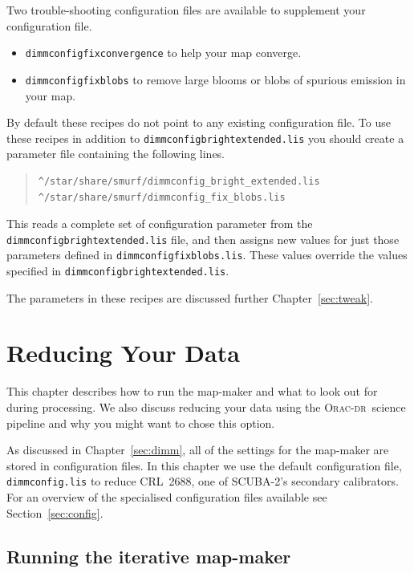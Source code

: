 \documentclass[twoside,11pt]{article}
\newcommand{\htmladdnormallink}[2]{#1}
\newcommand{\htmlref}[2]{#1}
\newcommand{\latexhtml}[2]{#1}
\newcommand{\xlabel}[1]{}
\renewcommand{\_}{\texttt{\symbol{95}}}
\newcommand{\oracdr}{\htmladdnormallink{\textsc{Orac-dr}}{http://www.oracdr.org/oracdr}}
\newcommand{\file}[1]{\texttt{#1}}
\newcommand{\cref}[3]{\latexhtml{#1~\ref{#2}}{\htmlref{#3}{#2}}}
\begin{document}
Two trouble-shooting configuration files are available to supplement your
configuration file.
\begin{itemize}[noitemsep]
\item \file{dimmconfig\_fix\_convergence} to help your map converge.
\item \file{dimmconfig\_fix\_blobs} to remove large blooms or blobs of spurious
emission in your map.
\end{itemize}
By default these recipes do not point to any existing configuration file. To use
these recipes in addition to  \file{dimmconfig\_bright\_extended.lis} you should
create a parameter file containing the following lines.
\begin{quote}
\begin{verbatim}
^/star/share/smurf/dimmconfig_bright_extended.lis
^/star/share/smurf/dimmconfig_fix_blobs.lis
\end{verbatim}
\end{quote}
This reads a complete set of configuration parameter from the
\file{dimmconfig\_bright\_extended.lis} file, and then assigns new values for just
those parameters defined in \file{dimmconfig\_fix\_blobs.lis}. These values override
the values specified in \file{dimmconfig\_bright\_extended.lis}.

The parameters in these recipes are discussed further
\cref{Chapter}{sec:tweak}{Tailoring Your Reduction}.

\clearpage

\section{\xlabel{maps}Reducing Your Data}
\label{sec:maps}

This chapter describes how to run the map-maker and what to look out
for during processing. We also discuss reducing your data using the
\oracdr\ science pipeline and why you might want to chose this option.

As discussed in \cref{Chapter}{sec:dimm}{The
Dynamic Iterative Map-Maker}, all of the settings for the map-maker
are stored in configuration files. In this chapter we use
the default configuration file, \file{dimmconfig.lis} to reduce CRL~2688,
one of SCUBA-2's secondary calibrators. For an
overview of the specialised configuration files available see
\cref{Section}{sec:config}{this section}.

\subsection{\xlabel{running_dimm}Running the iterative map-maker}
\label{sec:running}
\end{document}
